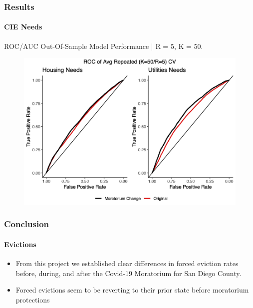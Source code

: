 \documentclass{beamer} %
\begin{document}
\begin{frame}
\frametitle{Results}
\framesubtitle{CIE Needs}
ROC/AUC Out-Of-Sample Model Performance | R = 5, K = 50.
\begin{figure}[H]
  \includegraphics[width=0.7\linewidth]{figures/auc_roc_out_of_sample.png}
  \label{auc_roc_out_of_sample}
\end{figure}

\begin{table}[!htbp]
\centering
\label{}
\end{table}


\end{frame}





\begin{frame}
\frametitle{Conclusion}
\framesubtitle{Evictions}


\begin{itemize}
	\item From this project we established clear differences in forced eviction rates before, during, and after the Covid-19 Moratorium for San Diego County.
	\item Forced evictions seem to be reverting to their prior state before moratorium protections
\end{itemize}

\end{frame}
\end{document}
